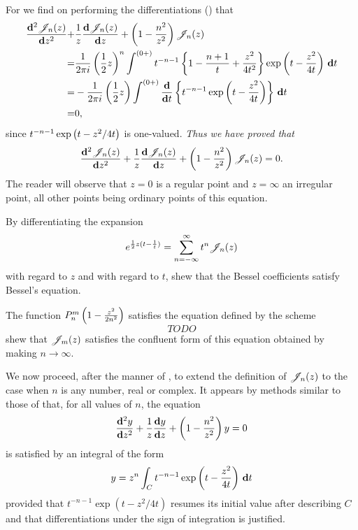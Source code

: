 For we find on performing the differentiations
() that
\begin{align*}
  \frac{\mathbf{d}^{2} \mathscr{J}_{n}(z)}{\mathbf{d} z^{2}}
  +& \frac{1}{z} \frac{\mathbf{d} \mathscr{J}_{n}(z)}{\mathbf{d} z}
  + \left(  1 - \frac{n^{2}}{z^{2}}   \right) \mathscr{J}_{n}(z)
  \\
  =&
  \frac{1}{2\pi i}
  \left(  \frac{1}{2} z   \right)^{n}
  \int^{(0+)}
  t^{-n-1}
  \left\{  1 - \frac{n+1}{t} + \frac{z^{2}}{4t^{2}}   \right\}
  \exp\left(  t - \frac{z^{2}}{4t}   \right)
  \, \mathbf{d} t \\
  =&
  -\frac{1}{2\pi i}
  \left(  \frac{1}{2} z   \right)
  \int^{(0+)}
  \frac{\mathbf{d}}{\mathbf{d} t} \left\{  t^{-n-1} \exp\left(  t - \frac{z^{2}}{4t}   \right)
   \right\}
  \, \mathbf{d} t \\
  =& 0,
\end{align*}
since $t^{-n-1} \exp\left(  t - z^{2}/4t   \right)$ is one-valued.
\emph{Thus we have proved that }
$$
\frac{\mathbf{d}^{2} \mathscr{J}_{n}(z)}{\mathbf{d} z^{2}}
+ \frac{1}{z} \frac{\mathbf{d} \mathscr{J}_{n}(z)}{\mathbf{d} z}
+ \left(  1 - \frac{n^{2}}{z^{2}}   \right) \mathscr{J}_{n}(z)
= 0.
$$
The reader will observe that $z=0$ is a regular point and
$z = \infty$ an irregular point, all other points being ordinary
points of this equation.
%
%
\begin{wandwexample}
  By differentiating the expansion
  $$
  e^{\frac{1}{2} z (t - \frac{1}{t})} = \sum_{n=-\infty}^{\infty} t^{n} \mathscr{J}_{n}(z)
  $$
  with regard to $z$ and with regard to $t$, shew that the Bessel
  coefficients satisfy Bessel's equation.
\end{wandwexample}
\begin{wandwexample}
  The function $P_{n}^{m}\left(  1 - \frac{z^{2}}{2n^{2}}   \right)$ satisfies the
  equation defined by the scheme
  $$
  TODO
  $$
  shew that $\mathscr{J}_{m}(z)$ satisfies the confluent form of this equation
  obtained by making $n \rightarrow \infty$.
\end{wandwexample}
We now proceed, after the manner of , to
extend the definition of $\mathscr{J}_{n}(z)$ to the case when $n$ is any number,
real or complex. It appears by methods similar to those of
 that, for all values of $n$, the
equation
$$
\frac{\mathbf{d}^{2} y}{\mathbf{d} z^{2}}
+ \frac{1}{z} \frac{\mathbf{d} y}{\mathbf{d} z}
+ \left(  1 - \frac{n^{2}}{z^{2}}   \right) y
= 0
$$
is satisfied by an integral of the form
$$
y
=
z^{n}
\int_{C}
t^{-n-1}
\exp \left(  t - \frac{z^{2}}{4t}   \right)
\, \mathbf{d} t
$$
provided that $t^{-n-1}\exp(t - z^{2}/4t)$ resumes its initial value
after describing $C$ and that differentiations under the sign of
integration is justified.

